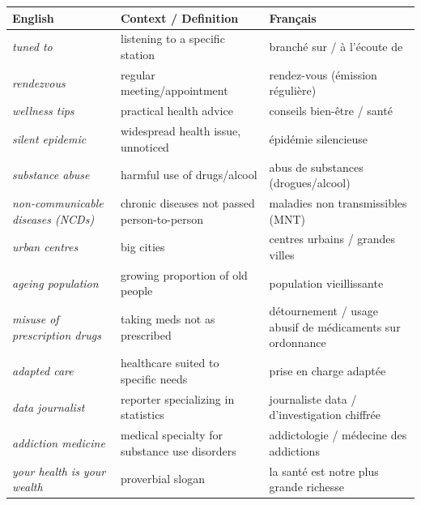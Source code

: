 \documentclass[11pt]{article}
\newcommand{\eng}[1]{\ifmmode\text{\textit{#1}}\else\begingroup\selectlanguage{english}\itshape #1\endgroup\fi}
\begin{document}
\begin{definition}
\begin{center}
\begin{tabularx}{\linewidth}{|l|X|l|}
\hline
\rowcolor{popblueL} \textbf{English} & \textbf{Context / Definition} & \textbf{Français} \\ \hline
\eng{tuned to} & listening to a specific station & branché sur / à l'écoute de \\ \hline
\eng{rendezvous} & regular meeting/appointment & rendez-vous (émission régulière) \\ \hline
\eng{wellness tips} & practical health advice & conseils bien-être / santé \\ \hline
\eng{silent epidemic} & widespread health issue, unnoticed & épidémie silencieuse \\ \hline
\eng{substance abuse} & harmful use of drugs/alcool & abus de substances (drogues/alcool) \\ \hline
\eng{non-communicable diseases (NCDs)} & chronic diseases not passed person-to-person & maladies non transmissibles (MNT) \\ \hline
\eng{urban centres} & big cities & centres urbains / grandes villes \\ \hline
\eng{ageing population} & growing proportion of old people & population vieillissante \\ \hline
\eng{misuse of prescription drugs} & taking meds not as prescribed & détournement / usage abusif de médicaments sur ordonnance \\ \hline
\eng{adapted care} & healthcare suited to specific needs & prise en charge adaptée \\ \hline
\eng{data journalist} & reporter specializing in statistics & journaliste data / d'investigation chiffrée \\ \hline
\eng{addiction medicine} & medical specialty for substance use disorders & addictologie / médecine des addictions \\ \hline
\eng{your health is your wealth} & proverbial slogan & la santé est notre plus grande richesse \\ \hline
\end{tabularx}
\end{center}
\end{definition}
\end{document}
